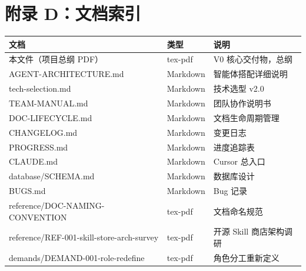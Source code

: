 \documentclass[11pt,a4paper]{article}
\begin{document}
\section{附录 D：文档索引}

\begin{table}[h]
\centering
\small
\begin{tabular}{llp{6cm}}
\toprule
\textbf{文档} & \textbf{类型} & \textbf{说明} \\
\midrule
本文件（项目总纲 PDF） & tex-pdf & V0 核心交付物，总纲 \\
AGENT-ARCHITECTURE.md & Markdown & 智能体搭配详细说明 \\
tech-selection.md & Markdown & 技术选型 v2.0 \\
TEAM-MANUAL.md & Markdown & 团队协作说明书 \\
DOC-LIFECYCLE.md & Markdown & 文档生命周期管理 \\
CHANGELOG.md & Markdown & 变更日志 \\
PROGRESS.md & Markdown & 进度追踪表 \\
CLAUDE.md & Markdown & Cursor 总入口 \\
database/SCHEMA.md & Markdown & 数据库设计 \\
BUGS.md & Markdown & Bug 记录 \\
reference/DOC-NAMING-CONVENTION & tex-pdf & 文档命名规范 \\
reference/REF-001-skill-store-arch-survey & tex-pdf & 开源 Skill 商店架构调研 \\
demands/DEMAND-001-role-redefine & tex-pdf & 角色分工重新定义 \\
\bottomrule
\end{tabular}
\end{table}
\end{document}
